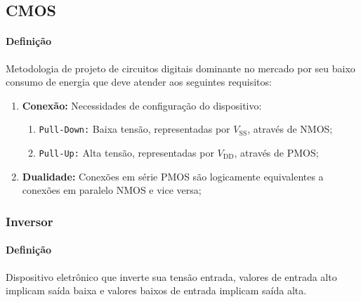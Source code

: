 \documentclass{article}
\begin{document}
        \subsection{CMOS}
            \paragraph{Definição}Metodologia de projeto de circuitos digitais dominante no mercado por seu baixo consumo de energia que deve atender aos seguintes requisitos:
                \begin{enumerate}[rightmargin = \leftmargin]
                    \item \textbf{Conexão:} Necessidades de configuração do dispositivo:
                        \begin{enumerate}[noitemsep]
                            \item \texttt{Pull-Down:} Baixa tensão, representadas por $V_{\text{SS}}$, através de NMOS;
                            \item \texttt{Pull-Up:} Alta tensão, representadas por $V_{\text{DD}}$, através de PMOS;
                        \end{enumerate}
                    \item \textbf{Dualidade:} Conexões em série PMOS são logicamente equivalentes a conexões em paralelo NMOS e vice versa;
                \end{enumerate}

        \subsubsection{Inversor}
            \paragraph{Definição}Dispositivo eletrônico que inverte sua tensão entrada, valores de entrada alto implicam saída baixa e valores baixos de entrada implicam saída alta.
\end{document}
